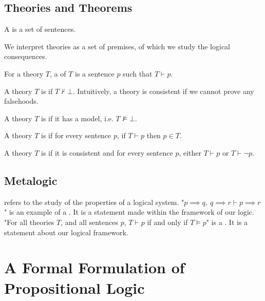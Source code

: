 \documentclass[11pt]{article}
\begin{document}
\subsection{Theories and Theorems}
\begin{defi}
    [Theory]
    A  is a set of sentences.
\end{defi}
We interpret theories as a set of premises, of which we study the logical consequences.
\begin{defi}
    [Theorem]
    For a theory $T$, a  of $T$ is a sentence $p$ such that $T \vdash p$.
\end{defi}
\begin{defi}
    A theory $T$ is  if $T \not\vdash \bot$.
    Intuitively, a theory is consistent if we cannot prove any falsehoods.
\end{defi}
\begin{defi}
    A theory $T$ is  if it has a model, i.e. $T \not\vDash \bot$.
\end{defi}
\begin{defi}
    A theory $T$ is  if for every sentence $p$, if $T \vdash p$ then $p \in T$.
\end{defi}
\begin{defi}
    A theory $T$ is  if it is consistent and for every sentence $p$, either $T \vdash p$ or $T \vdash \neg p$.
\end{defi}
\subsection{Metalogic}
\label{sec:informalMetalogic}
 refers to the study of the properties of a logical system.
\mypar
"$p \implies q, \ q \implies r \vdash p \implies r$" is an example of a . It is a statement made within the framework of our logic.
\mypar
"For all theories $T$, and all sentences $p$, $T \vdash p$ if and only if $T \vDash p$" is a . It is a statement about our logical framework.
\pagebreak
\section{A Formal Formulation of Propositional Logic}
\end{document}
